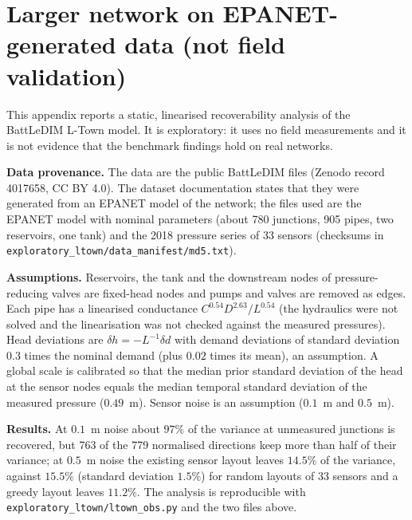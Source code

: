 \documentclass[conference]{IEEEtran}
\begin{document}
\section{Larger network on EPANET-generated data (not field validation)}

This appendix reports a static, linearised recoverability analysis of the BattLeDIM L-Town model. It is exploratory: it uses no field measurements and it is not evidence that the benchmark findings hold on real networks.

\textbf{Data provenance.} The data are the public BattLeDIM files (Zenodo record 4017658, CC BY 4.0). The dataset documentation states that they were generated from an EPANET model of the network; the files used are the EPANET model with nominal parameters (about 780 junctions, 905 pipes, two reservoirs, one tank) and the 2018 pressure series of 33 sensors (checksums in \texttt{exploratory\_ltown/data\_manifest/md5.txt}).

\textbf{Assumptions.} Reservoirs, the tank and the downstream nodes of pressure-reducing valves are fixed-head nodes and pumps and valves are removed as edges. Each pipe has a linearised conductance $C^{0.54}D^{2.63}/L^{0.54}$ (the hydraulics were not solved and the linearisation was not checked against the measured pressures). Head deviations are $\delta h=-L^{-1}\delta d$ with demand deviations of standard deviation $0.3$ times the nominal demand (plus $0.02$ times its mean), an assumption. A global scale is calibrated so that the median prior standard deviation of the head at the sensor nodes equals the median temporal standard deviation of the measured pressure ($0.49$~m). Sensor noise is an assumption ($0.1$~m and $0.5$~m).

\textbf{Results.} At $0.1$~m noise about $97\%$ of the variance at unmeasured junctions is recovered, but 763 of the 779 normalised directions keep more than half of their variance; at $0.5$~m noise the existing sensor layout leaves $14.5\%$ of the variance, against $15.5\%$ (standard deviation $1.5\%$) for random layouts of 33 sensors and a greedy layout leaves $11.2\%$. The analysis is reproducible with \texttt{exploratory\_ltown/ltown\_obs.py} and the two files above.
\end{document}
